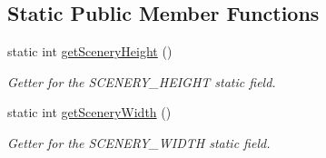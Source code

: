 \subsection*{Static Public Member Functions}
\begin{DoxyCompactItemize}
\item 
static int \hyperlink{a00024_ad49a4c8ba7e7c464b49b30efea953a66}{get\-Scenery\-Height} ()
\begin{DoxyCompactList}\small\item\em Getter for the S\-C\-E\-N\-E\-R\-Y\-\_\-\-H\-E\-I\-G\-H\-T static field. \end{DoxyCompactList}\item 
static int \hyperlink{a00024_ab0ba1fc1e7266f25ac7b1b7d36d2b5b8}{get\-Scenery\-Width} ()
\begin{DoxyCompactList}\small\item\em Getter for the S\-C\-E\-N\-E\-R\-Y\-\_\-\-W\-I\-D\-T\-H static field. \end{DoxyCompactList}\end{DoxyCompactItemize}
